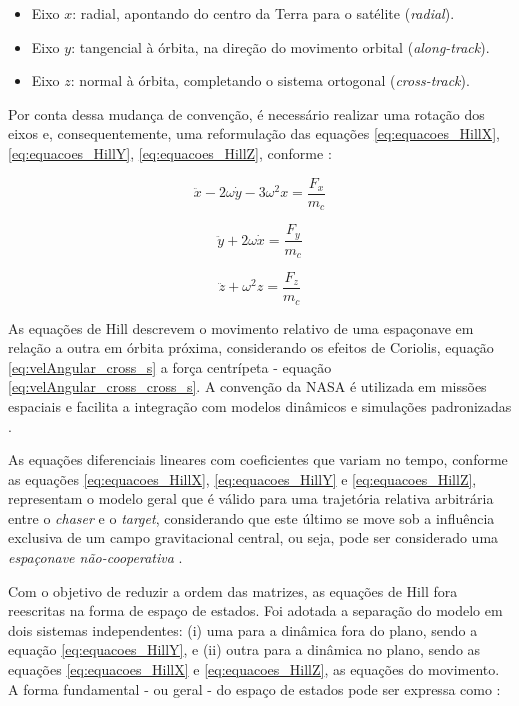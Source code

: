 \begin{itemize}
    \item Eixo $x$: radial, apontando do centro da Terra para o satélite (\emph{radial}).
    \item Eixo $y$: tangencial à órbita, na direção do movimento orbital  (\emph{along-track}).
    \item Eixo $z$: normal à órbita, completando o sistema ortogonal  (\emph{cross-track}).
\end{itemize}

Por conta dessa mudança de convenção, é necessário realizar uma rotação dos eixos e, consequentemente, uma reformulação das equações \eqref{eq:equacoes_HillX}, \eqref{eq:equacoes_HillY}, \eqref{eq:equacoes_HillZ}, conforme \cite{sidi1997spacecraft}:

\begin{equation}
    \label{eq:Hill_NASA_X}
    \ddot{x} - 2\omega \dot{y} - 3\omega^2 x = \frac{F_x}{m_c}
\end{equation}

\begin{equation}
    \label{eq:Hill_NASA_Y}
    \ddot{y} + 2\omega \dot{x} = \frac{F_y}{m_c}
\end{equation}

\begin{equation}
    \label{eq:Hill_NASA_Z}
    \ddot{z} + \omega^2 z = \frac{F_z}{m_c}
\end{equation}

As equações de Hill descrevem o movimento relativo de uma espaçonave em relação a outra em órbita próxima, considerando os efeitos de Coriolis, equação \eqref{eq:velAngular_cross_s} a força centrípeta - equação \eqref{eq:velAngular_cross_cross_s}. A convenção da NASA é utilizada em missões espaciais e facilita a integração com modelos dinâmicos e simulações padronizadas \cite{Folta2022}.


As equações diferenciais lineares com coeficientes que variam no tempo, conforme as equações \eqref{eq:equacoes_HillX}, \eqref{eq:equacoes_HillY} e \eqref{eq:equacoes_HillZ}, representam o modelo geral que é válido para uma trajetória relativa arbitrária \cite{debruijn2011,ortolano2017} entre o \emph{chaser} e o \emph{target}, considerando que este último se move sob a influência exclusiva de um campo gravitacional central, ou seja, pode ser considerado uma \emph{espaçonave não-cooperativa} \cite{mahendrakar2023}.

Com o objetivo de reduzir a ordem das matrizes, as equações de Hill fora reescritas na forma de espaço de estados. Foi adotada a separação do modelo em dois sistemas independentes: (i) uma para a dinâmica fora do plano, sendo a equação \eqref{eq:equacoes_HillY}, e (ii) outra para a dinâmica no plano, sendo as equações \eqref{eq:equacoes_HillX} e \eqref{eq:equacoes_HillZ}, as equações do movimento. A forma fundamental - ou geral - do espaço de estados pode ser expressa como \cite{fehse2003,starek2016,sherrill2014}:

